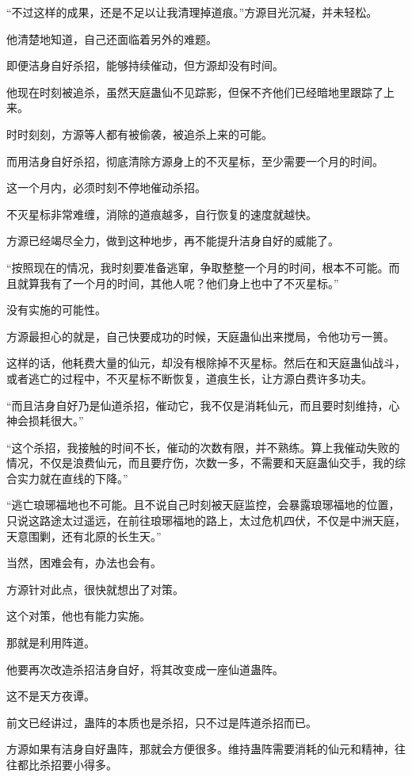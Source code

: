 \begin{this_body}
“不过这样的成果，还是不足以让我清理掉道痕。”方源目光沉凝，并未轻松。

他清楚地知道，自己还面临着另外的难题。

即便洁身自好杀招，能够持续催动，但方源却没有时间。

他现在时刻被追杀，虽然天庭蛊仙不见踪影，但保不齐他们已经暗地里跟踪了上来。

时时刻刻，方源等人都有被偷袭，被追杀上来的可能。

而用洁身自好杀招，彻底清除方源身上的不灭星标，至少需要一个月的时间。

这一个月内，必须时刻不停地催动杀招。

不灭星标非常难缠，消除的道痕越多，自行恢复的速度就越快。

方源已经竭尽全力，做到这种地步，再不能提升洁身自好的威能了。

“按照现在的情况，我时刻要准备逃窜，争取整整一个月的时间，根本不可能。而且就算我有了一个月的时间，其他人呢？他们身上也中了不灭星标。”

没有实施的可能性。

方源最担心的就是，自己快要成功的时候，天庭蛊仙出来搅局，令他功亏一篑。

这样的话，他耗费大量的仙元，却没有根除掉不灭星标。然后在和天庭蛊仙战斗，或者逃亡的过程中，不灭星标不断恢复，道痕生长，让方源白费许多功夫。

“而且洁身自好乃是仙道杀招，催动它，我不仅是消耗仙元，而且要时刻维持，心神会损耗很大。”

“这个杀招，我接触的时间不长，催动的次数有限，并不熟练。算上我催动失败的情况，不仅是浪费仙元，而且要疗伤，次数一多，不需要和天庭蛊仙交手，我的综合实力就在直线的下降。”

“逃亡琅琊福地也不可能。且不说自己时刻被天庭监控，会暴露琅琊福地的位置，只说这路途太过遥远，在前往琅琊福地的路上，太过危机四伏，不仅是中洲天庭，天意围剿，还有北原的长生天。”

当然，困难会有，办法也会有。

方源针对此点，很快就想出了对策。

这个对策，他也有能力实施。

那就是利用阵道。

他要再次改造杀招洁身自好，将其改变成一座仙道蛊阵。

这不是天方夜谭。

前文已经讲过，蛊阵的本质也是杀招，只不过是阵道杀招而已。

方源如果有洁身自好蛊阵，那就会方便很多。维持蛊阵需要消耗的仙元和精神，往往都比杀招要小得多。


\end{this_body}
